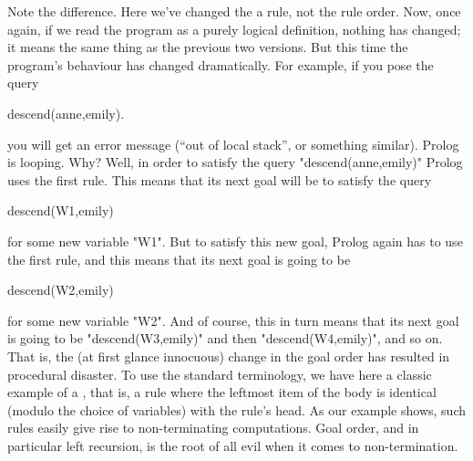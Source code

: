 Note the difference. Here we've changed the 
a rule, not the rule order.  Now, once again, if we read the
program as a purely logical definition, nothing has changed; it means
the same thing as the previous two versions. But this time the
program's behaviour has changed dramatically.  For example, if you
pose the query
\begin{LPNcodedisplay}
descend(anne,emily).
\end{LPNcodedisplay}
you will get an error message (``out of local stack'', or something
similar). Prolog is looping. Why?  Well, in order to satisfy the query
"descend(anne,emily)" Prolog uses the first rule. This means that
its next goal will be to satisfy the query
\begin{LPNcodedisplay}
descend(W1,emily)
\end{LPNcodedisplay}
for some new variable "W1". But to satisfy this new goal, Prolog
again has to use the first rule, and this means that its next goal is
going to be
\begin{LPNcodedisplay}
descend(W2,emily)
\end{LPNcodedisplay}
for some new variable "W2". And of course, this in turn means that its
next goal is going to be "descend(W3,emily)" and then
"descend(W4,emily)", and so on.  That is, the (at first glance
innocuous) change in the goal order has resulted in procedural
disaster.  To use the standard terminology, we have here a classic
example of a , that is, a rule where the
leftmost item of the body is identical (modulo the choice of
variables) with the rule's head.  As our example shows, such rules
easily give rise to non-terminating computations.  Goal order, and in
particular left recursion, is the root of all evil when it comes to
non-termination.

